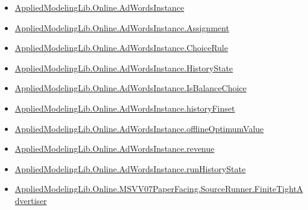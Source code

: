 \documentclass[10pt]{article}
\begin{document}
\begin{itemize}\raggedright
\item \hyperlink{governing-declaration-e5ce49672bf26ab1}{Applied\allowbreak{}Modeling\allowbreak{}Lib.\allowbreak{}Online.\allowbreak{}Ad\allowbreak{}Words\allowbreak{}Instance}
\item \hyperlink{governing-declaration-1626714e7e9b5a7b}{Applied\allowbreak{}Modeling\allowbreak{}Lib.\allowbreak{}Online.\allowbreak{}Ad\allowbreak{}Words\allowbreak{}Instance.\allowbreak{}Assignment}
\item \hyperlink{governing-declaration-7499c79a154f70f9}{Applied\allowbreak{}Modeling\allowbreak{}Lib.\allowbreak{}Online.\allowbreak{}Ad\allowbreak{}Words\allowbreak{}Instance.\allowbreak{}Choice\allowbreak{}Rule}
\item \hyperlink{governing-declaration-0df03b0ef577c095}{Applied\allowbreak{}Modeling\allowbreak{}Lib.\allowbreak{}Online.\allowbreak{}Ad\allowbreak{}Words\allowbreak{}Instance.\allowbreak{}History\allowbreak{}State}
\item \hyperlink{governing-declaration-596b56e9de646cec}{Applied\allowbreak{}Modeling\allowbreak{}Lib.\allowbreak{}Online.\allowbreak{}Ad\allowbreak{}Words\allowbreak{}Instance.\allowbreak{}Is\allowbreak{}Balance\allowbreak{}Choice}
\item \hyperlink{governing-declaration-f82d31a74d86d369}{Applied\allowbreak{}Modeling\allowbreak{}Lib.\allowbreak{}Online.\allowbreak{}Ad\allowbreak{}Words\allowbreak{}Instance.\allowbreak{}history\allowbreak{}Finset}
\item \hyperlink{governing-declaration-421b6f6fda18a867}{Applied\allowbreak{}Modeling\allowbreak{}Lib.\allowbreak{}Online.\allowbreak{}Ad\allowbreak{}Words\allowbreak{}Instance.\allowbreak{}offline\allowbreak{}Optimum\allowbreak{}Value}
\item \hyperlink{governing-declaration-1e04f550d5bab192}{Applied\allowbreak{}Modeling\allowbreak{}Lib.\allowbreak{}Online.\allowbreak{}Ad\allowbreak{}Words\allowbreak{}Instance.\allowbreak{}revenue}
\item \hyperlink{governing-declaration-ed8743a9c37be3cc}{Applied\allowbreak{}Modeling\allowbreak{}Lib.\allowbreak{}Online.\allowbreak{}Ad\allowbreak{}Words\allowbreak{}Instance.\allowbreak{}run\allowbreak{}History\allowbreak{}State}
\item \hyperlink{governing-declaration-48ee018f3cdad0d9}{Applied\allowbreak{}Modeling\allowbreak{}Lib.\allowbreak{}Online.\allowbreak{}MSVV07\allowbreak{}Paper\allowbreak{}Facing.\allowbreak{}Source\allowbreak{}Runner.\allowbreak{}Finite\allowbreak{}Tight\allowbreak{}Advertiser}

\end{itemize}
\end{document}
